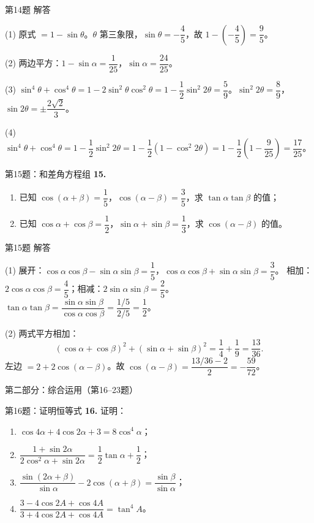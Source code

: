 \documentclass[10pt,aspectratio=169,serif]{beamer}
\begin{document}
\begin{frame}[t]{第14题 解答}
\begin{tcolorbox}[colback=orange!10,colframe=orange,title=\textbf{解}]
(1) 原式 $=1-\sin\theta$。$\theta$ 第三象限，$\sin\theta=-\dfrac45$，故 $1-(-\dfrac45)=\dfrac95$。

(2) 两边平方：$1-\sin\alpha=\dfrac1{25}$，$\sin\alpha=\dfrac{24}{25}$。

(3) $\sin^4\theta+\cos^4\theta=1-2\sin^2\theta\cos^2\theta=1-\dfrac12\sin^2 2\theta=\dfrac59$。$\sin^2 2\theta=\dfrac89$，$\sin 2\theta=\pm\dfrac{2\sqrt2}{3}$。

(4) $\sin^4\theta+\cos^4\theta=1-\dfrac12\sin^2 2\theta=1-\dfrac12(1-\cos^2 2\theta)=1-\dfrac12(1-\dfrac9{25})=\dfrac{17}{25}$。
\end{tcolorbox}
\end{frame}

\begin{frame}[t]{第15题：和差角方程组}
\textbf{15.}
\begin{enumerate}
  \item 已知 $\cos(\alpha+\beta)=\dfrac15$，$\cos(\alpha-\beta)=\dfrac35$，求 $\tan\alpha\tan\beta$ 的值；
  \item 已知 $\cos\alpha+\cos\beta=\dfrac12$，$\sin\alpha+\sin\beta=\dfrac13$，求 $\cos(\alpha-\beta)$ 的值。
\end{enumerate}
\end{frame}

\begin{frame}[t]{第15题 解答}
\begin{tcolorbox}[colback=orange!10,colframe=orange,title=\textbf{解}]
(1) 展开：$\cos\alpha\cos\beta-\sin\alpha\sin\beta=\dfrac15$，$\cos\alpha\cos\beta+\sin\alpha\sin\beta=\dfrac35$。
相加：$2\cos\alpha\cos\beta=\dfrac45$；相减：$2\sin\alpha\sin\beta=\dfrac25$。
$\tan\alpha\tan\beta=\dfrac{\sin\alpha\sin\beta}{\cos\alpha\cos\beta}=\dfrac{1/5}{2/5}=\dfrac12$。

(2) 两式平方相加：
\[
(\cos\alpha+\cos\beta)^2+(\sin\alpha+\sin\beta)^2=\frac14+\frac19=\frac{13}{36}.
\]
左边 $=2+2\cos(\alpha-\beta)$。故 $\cos(\alpha-\beta)=\dfrac{13/36-2}{2}=-\dfrac{59}{72}$。
\end{tcolorbox}
\end{frame}

\begin{frame}{第二部分：综合运用（第16--23题）}
\end{frame}

\begin{frame}[t]{第16题：证明恒等式}
\textbf{16.} 证明：
\begin{enumerate}
  \item $\cos 4\alpha+4\cos 2\alpha+3=8\cos^4\alpha$；
  \item $\dfrac{1+\sin 2\alpha}{2\cos^2\alpha+\sin 2\alpha}=\dfrac12\tan\alpha+\dfrac12$；
  \item $\dfrac{\sin(2\alpha+\beta)}{\sin\alpha}-2\cos(\alpha+\beta)=\dfrac{\sin\beta}{\sin\alpha}$；
  \item $\dfrac{3-4\cos 2A+\cos 4A}{3+4\cos 2A+\cos 4A}=\tan^4 A$。
\end{enumerate}
\end{frame}
\end{document}
